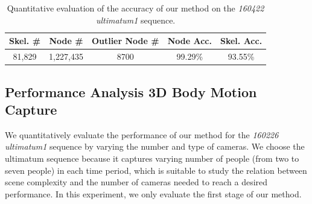 \begin{table} [t]	
	\centering
	\caption{Quantitative evaluation of the accuracy of our method on the \emph{160422 ultimatum1} sequence. }\label{Table:otherDataset}
	\begin{tabular}{c|c|c|c|c}
		\hline 
		{Skel. \#} & {Node \#} & {Outlier Node \#} & {Node Acc.}  & {Skel. Acc.} \tabularnewline
		\hline 
		81,829 & 1,227,435 & 8700 & 99.29\% & 93.55\% \tabularnewline
		\hline 
	\end{tabular} 
	\label{table:quant_stat}
\end{table}


\subsection{Performance Analysis 3D Body Motion Capture}

We quantitatively evaluate the performance of our method for the \emph{160226 ultimatum1} sequence by varying the number and type of cameras. We choose the ultimatum sequence because it captures varying number of people (from two to seven people) in each time period, which is suitable to study the relation between scene complexity and the number of cameras needed to reach a desired performance. In this experiment, we only evaluate the first stage of our method.  

